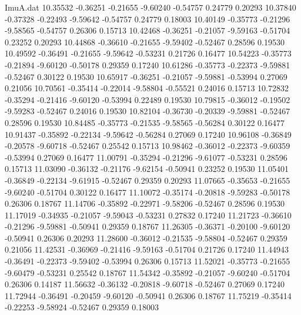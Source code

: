 \begin{filecontents}{ImuA.dat}
  10.35532   -0.36251   -0.21655   -9.60240   -0.54757    0.24779    0.20293
  10.37840   -0.37328   -0.22493   -9.59642   -0.54757    0.24779    0.18003
  10.40149   -0.35773   -0.21296   -9.58565   -0.54757    0.26306    0.15713
  10.42468   -0.36251   -0.21057   -9.59163   -0.51704    0.23252    0.20293
  10.44868   -0.36610   -0.21655   -9.59402   -0.52467    0.28596    0.19530
  10.49592   -0.36491   -0.21655   -9.59642   -0.53231    0.21726    0.16477
  10.54223   -0.35773   -0.21894   -9.60120   -0.50178    0.29359    0.17240
  10.61286   -0.35773   -0.22373   -9.59881   -0.52467    0.30122    0.19530
  10.65917   -0.36251   -0.21057   -9.59881   -0.53994    0.27069    0.21056
  10.70561   -0.35414   -0.22014   -9.58804   -0.55521    0.24016    0.15713
  10.72832   -0.35294   -0.21416   -9.60120   -0.53994    0.22489    0.19530
  10.79815   -0.36012   -0.19502   -9.59283   -0.52467    0.24016    0.19530
  10.82104   -0.36730   -0.20339   -9.59881   -0.52467    0.28596    0.19530
  10.84485   -0.35773   -0.21535   -9.58565   -0.56284    0.30122    0.16477
  10.91437   -0.35892   -0.22134   -9.59642   -0.56284    0.27069    0.17240
  10.96108   -0.36849   -0.20578   -9.60718   -0.52467    0.25542    0.15713
  10.98462   -0.36012   -0.22373   -9.60359   -0.53994    0.27069    0.16477
  11.00791   -0.35294   -0.21296   -9.61077   -0.53231    0.28596    0.15713
  11.03090   -0.36132   -0.21176   -9.62154   -0.50941    0.23252    0.19530
  11.05401   -0.36849   -0.22134   -9.61915   -0.52467    0.29359    0.20293
  11.07665   -0.35653   -0.21655   -9.60240   -0.51704    0.30122    0.16477
  11.10072   -0.35174   -0.20818   -9.59283   -0.50178    0.26306    0.18767
  11.14706   -0.35892   -0.22971   -9.58206   -0.52467    0.28596    0.19530
  11.17019   -0.34935   -0.21057   -9.59043   -0.53231    0.27832    0.17240
  11.21723   -0.36610   -0.21296   -9.59881   -0.50941    0.29359    0.18767
  11.26305   -0.36371   -0.20100   -9.60120   -0.50941    0.26306    0.20293
  11.28600   -0.36012   -0.21535   -9.58804   -0.52467    0.29359    0.21056
  11.42531   -0.36969   -0.21416   -9.59163   -0.51704    0.21726    0.17240
  11.44943   -0.36491   -0.22373   -9.59402   -0.53994    0.26306    0.15713
  11.52021   -0.35773   -0.21655   -9.60479   -0.53231    0.25542    0.18767
  11.54342   -0.35892   -0.21057   -9.60240   -0.51704    0.26306    0.14187
  11.56632   -0.36132   -0.20818   -9.60718   -0.52467    0.27069    0.17240
  11.72944   -0.36491   -0.20459   -9.60120   -0.50941    0.26306    0.18767
  11.75219   -0.35414   -0.22253   -9.58924   -0.52467    0.29359    0.18003

\end{filecontents}
